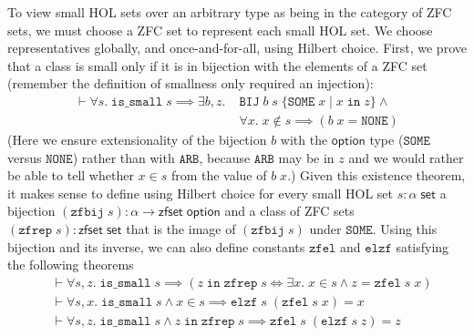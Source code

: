 \documentclass[twoside,titlepage,11pt]{article}
\begin{document}
To view small HOL sets over an arbitrary type as being in the category of ZFC sets, we must choose a ZFC set to represent each small HOL set.
We choose representatives globally, and once-and-for-all, using Hilbert choice.
First, we prove that a class is small only if it is in bijection with the elements of a ZFC set (remember the definition of smallness only required an injection):
\begin{align*}
\vdash\forall{s}.\;\mathtt{is\_small}\;s\implies\exists{b,z}.\;&\mathtt{BIJ}\;b\;s\;\{\mathtt{SOME}\;x\mid x\operatorname{\mathtt{in}}z\}\land{}\\
&\forall{x}.\;x\notin s\implies(b\;x=\mathtt{NONE})
\end{align*}
(Here we ensure extensionality of the bijection $b$ with the $\mathsf{option}$ type ($\mathtt{SOME}$ versus $\mathtt{NONE}$) rather than with $\mathtt{ARB}$, because $\mathtt{ARB}$ may be in $z$ and we would rather be able to tell whether $x\in s$ from the value of $b\;x$.)
Given this existence theorem, it makes sense to define using Hilbert choice for every small HOL set $s:\alpha\;\mathsf{set}$ a bijection $(\mathtt{zfbij}\;s):\alpha\to\mathsf{zfset}\;\mathsf{option}$ and a class of ZFC sets $(\mathtt{zfrep}\;s):\mathsf{zfset}\;\mathsf{set}$ that is the image of $(\mathtt{zfbij}\;s)$ under $\mathtt{SOME}$.
Using this bijection and its inverse, we can also define constants $\mathtt{zfel}$ and $\mathtt{elzf}$ satisfying the following theorems
\begin{align*}
&\vdash\forall{s,z}.\;\mathtt{is\_small}\;s\implies(z\operatorname{\mathtt{in}}\mathtt{zfrep}\;s\iff\exists{x}.\; x \in s \land z = \mathtt{zfel}\;s\;x)\\
&\vdash\forall{s,x}.\;\mathtt{is\_small}\;s\land x \in s\implies\mathtt{elzf}\;s\;(\mathtt{zfel}\;s\;x) = x\\
&\vdash\forall{s,z}.\;\mathtt{is\_small}\;s\land z \operatorname{\mathtt{in}} \mathtt{zfrep}\;s\implies\mathtt{zfel}\;s\;(\mathtt{elzf}\;s\;z) = z
\end{align*}
\end{document}

